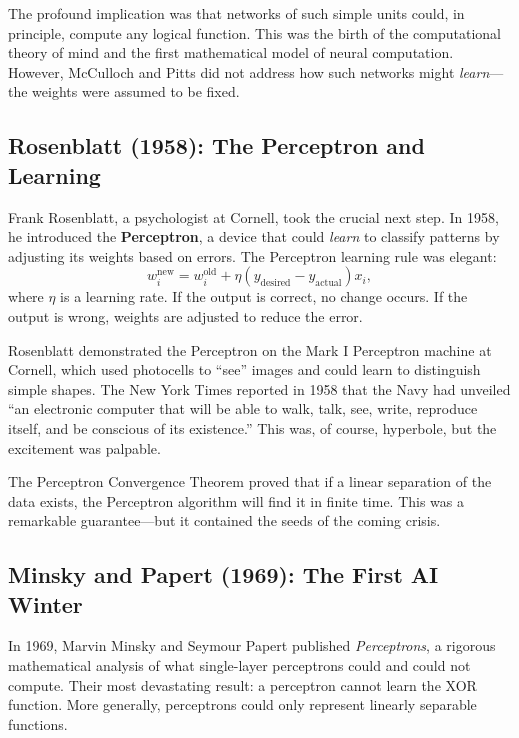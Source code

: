 The profound implication was that networks of such simple units could, in principle, compute any logical function. This was the birth of the computational theory of mind and the first mathematical model of neural computation. However, McCulloch and Pitts did not address how such networks might \textit{learn}---the weights were assumed to be fixed.

\subsection{Rosenblatt (1958): The Perceptron and Learning}

Frank Rosenblatt, a psychologist at Cornell, took the crucial next step. In 1958, he introduced the \textbf{Perceptron}, a device that could \textit{learn} to classify patterns by adjusting its weights based on errors. The Perceptron learning rule was elegant:
\begin{equation}
w_i^{\text{new}} = w_i^{\text{old}} + \eta (y_{\text{desired}} - y_{\text{actual}}) x_i,
\label{eq:perceptron_rule}
\end{equation}
where $\eta$ is a learning rate. If the output is correct, no change occurs. If the output is wrong, weights are adjusted to reduce the error.

Rosenblatt demonstrated the Perceptron on the Mark I Perceptron machine at Cornell, which used photocells to ``see'' images and could learn to distinguish simple shapes. The New York Times reported in 1958 that the Navy had unveiled ``an electronic computer that will be able to walk, talk, see, write, reproduce itself, and be conscious of its existence.'' This was, of course, hyperbole, but the excitement was palpable.

The Perceptron Convergence Theorem proved that if a linear separation of the data exists, the Perceptron algorithm will find it in finite time. This was a remarkable guarantee---but it contained the seeds of the coming crisis.

\subsection{Minsky and Papert (1969): The First AI Winter}

In 1969, Marvin Minsky and Seymour Papert published \textit{Perceptrons}, a rigorous mathematical analysis of what single-layer perceptrons could and could not compute. Their most devastating result: a perceptron cannot learn the XOR function. More generally, perceptrons could only represent linearly separable functions.

